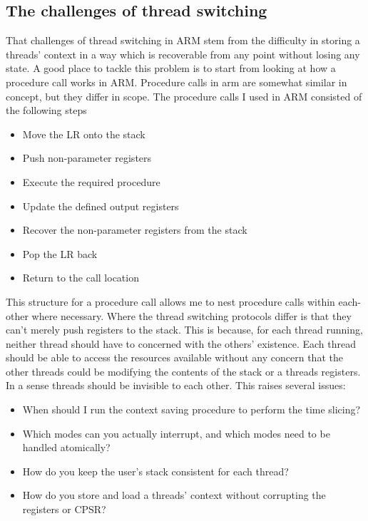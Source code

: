 \subsection{The challenges of thread switching}
\label{chap:Threading}
That challenges of thread switching in ARM stem from the difficulty in storing a threads' context in a way which is recoverable from any point without losing any state. A good place to tackle this problem is to start from looking at how a procedure call works in ARM. Procedure calls in arm are somewhat similar in concept, but they differ in scope. The procedure calls \cite{arm_man} I used in ARM consisted of the following steps
\begin{itemize}
	\item Move the LR onto the stack 
	\item Push non-parameter registers
	\item Execute the required procedure
	\item Update the defined output registers
	\item Recover the non-parameter registers from the stack
	\item Pop the LR back
	\item Return to the call location
\end{itemize} %
This structure for a procedure call allows me to nest procedure calls within each-other where necessary. Where the thread switching protocols differ is that they can't merely push registers to the stack. This is because, for each thread running, neither thread should have to concerned with the others' existence. Each thread should be able to access the resources available without any concern that the other threads could be modifying the contents of the stack or a threads registers. In a sense threads should be invisible to each other. This raises several issues:
\begin{itemize}
	\item When should I run the context saving procedure to perform the time slicing?
	\item Which modes can you actually interrupt, and which modes need to be handled atomically?
	\item How do you keep the user's stack consistent for each thread?
	\item How do you store and load a threads' context without corrupting the registers or CPSR?
\end{itemize}
